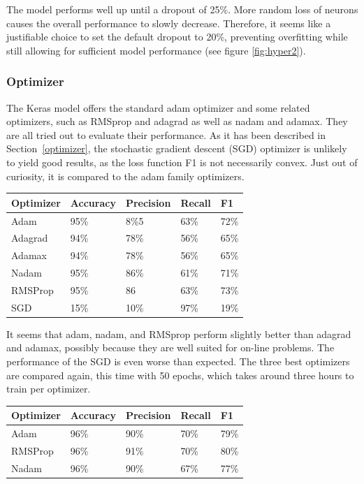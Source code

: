\documentclass[
a4paper,
pagesize,
pdftex,
12pt,
twoside, %
BCOR=5mm, %
ngerman,
fleqn,
final,
]{scrartcl}
\begin{document}
	The model performs well up until a dropout of 25\%. More random loss of neurons causes the overall performance to slowly decrease. Therefore, it seems like a justifiable choice to set the default dropout to 20\%, preventing overfitting while still allowing for sufficient model performance (see figure \ref{fig:hyper2}).

	\subsubsection{Optimizer}
	
	The Keras model offers the standard adam optimizer and some related optimizers, such as RMSprop and adagrad as well as nadam and adamax. They are all tried out to evaluate their performance. As it has been described in Section~\ref{optimizer}, the stochastic gradient descent (SGD) optimizer is unlikely to yield good results, as the loss function F1 is not necessarily convex. Just out of curiosity, it is compared to the adam family optimizers. 
	
	\begin{tabular}{ | p{3cm} || p{2cm}|p{2cm}|p{2cm}|p{2cm}|  }
		\hline
		\textbf{Optimizer} & \textbf{Accuracy} & \textbf{Precision} & \textbf{Recall} & \textbf{F1} \\
		\hline
		Adam & 95\% &  8\%5 &  63\% &  72\% \\  
		Adagrad & 94\% &  78\% &  56\% &  65\% \\ 
		Adamax & 94\% &  78\% &  56\% &  65\% \\ 
		Nadam & 95\% &  86\% &  61\% &  71\% \\ 
		RMSProp & 95\% &  86 &  63\% &  73\% \\ 
		SGD & 15\% &  10\% &  97\% & 19\% \\
		\hline
		\hline
	\end{tabular}
	
	It seems that adam, nadam, and RMSprop perform slightly better than adagrad and adamax, possibly because they are well suited for on-line problems. The performance of the SGD is even worse than expected. The three best optimizers are compared again, this time with 50 epochs, which takes around three hours to train per optimizer.
	
	\begin{tabular}{ | p{3cm} || p{2cm}|p{2cm}|p{2cm}|p{2cm}|  }
		\hline
		\textbf{Optimizer} & \textbf{Accuracy} & \textbf{Precision} & \textbf{Recall} & \textbf{F1} \\
		\hline
		Adam & 96\%& 90\%& 70\%& 79\% \\
		RMSProp & 96\% &  91\% &  70\% &  80\% \\ 
		Nadam & 96\% & 90\% & 67\% & 77\%\\
		\hline
		\hline
	\end{tabular}
	
\end{document}
